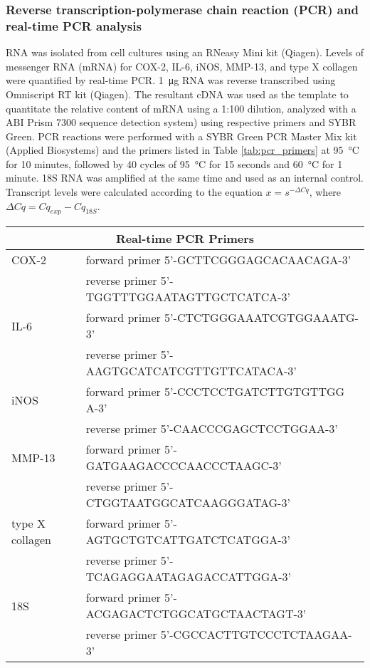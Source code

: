 \begin{refsection}
\subsubsection{Reverse transcription-polymerase chain reaction (PCR) and
real-time PCR analysis} RNA was isolated from cell cultures using an RNeasy Mini
kit (Qiagen). Levels of messenger RNA (mRNA) for COX-2, IL-6, iNOS, MMP-13, and
type X collagen were quantified by real-time PCR. \SI{1}{\micro\gram} RNA was
reverse transcribed using Omniscript RT kit (Qiagen). The resultant cDNA was
used as the template to quantitate the relative content of mRNA using a 1:100
dilution, analyzed with a ABI Prism 7300 sequence detection system) using
respective primers and SYBR Green.  PCR reactions were performed with a SYBR
Green PCR Master Mix kit (Applied Biosystems) and the primers listed in Table
\ref{tab:pcr_primers} at \SI{95}{\celsius} for 10 minutes, followed by 40 cycles
of \SI{95}{\celsius} for 15 seconds and \SI{60}{\celsius} for 1 minute. 18S RNA
was amplified at the same time and used as an internal control. Transcript
levels were calculated according to the equation ${x=s^{- \Delta C q}}$, where
${\Delta C q = C q_{exp} - C q _{18S}}$.

\begin{table}[h!]
    \centering
\begin{tabular}{ ll }
  \hline
  \multicolumn{2}{c}{Real-time PCR Primers} \\
  \hline

  COX-2 & 
  forward primer 5'-GCTTCGGGAGCACAACAGA-3' \\
  & reverse primer 5'-TGGTTTGGAATAGTTGCTCATCA-3' \\
  IL-6 & 
  forward primer 5'-CTCTGGGAAATCGTGGAAATG-3' \\
  & reverse primer 5'-AAGTGCATCATCGTTGTTCATACA-3' \\
  iNOS & 
  forward primer 5'-CCCTCCTGATCTTGTGTTGG A-3' \\
  & reverse primer 5'-CAACCCGAGCTCCTGGAA-3' \\
  MMP-13 & 
  forward primer 5'-GATGAAGACCCCAACCCTAAGC-3' \\
  & reverse primer 5'-CTGGTAATGGCATCAAGGGATAG-3' \\
  type X collagen & 
  forward primer 5'-AGTGCTGTCATTGATCTCATGGA-3' \\
  & reverse primer 5'-TCAGAGGAATAGAGACCATTGGA-3'\\
  18S & 
  forward primer 5'-ACGAGACTCTGGCATGCTAACTAGT-3' \\
  & reverse primer 5'-CGCCACTTGTCCCTCTAAGAA-3' \\


\end{tabular}
\end{table}
\end{refsection}
